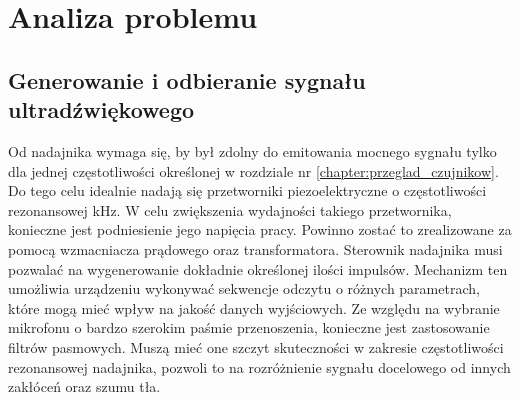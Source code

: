 \chapter[Analiza problemu]{Analiza problemu}

\label{chapter:analiza_problemu}


\def\w{1} %
\def\h{1} %

\newcommand{\mysin}[2] %
{%
  \begin{scope}[shift={#1}]
    \draw[thick,#2] (0,0) sin (0.125*\w,0.5*\h) cos (0.25*\w,0) sin (0.375*\w,-0.5*\h) cos (0.5*\w,0)
                          sin (0.625*\w,0.5*\h) cos (0.75*\w,0) sin (0.875*\w,-0.5*\h) cos (\w,0);
  \end{scope}
}

\section{Generowanie i odbieranie sygnału ultradźwiękowego}

Od nadajnika wymaga się, by był zdolny do emitowania mocnego sygnału tylko dla jednej częstotliwości określonej w rozdziale nr \ref{chapter:przeglad_czujnikow}.
Do tego celu idealnie nadają się przetworniki piezoelektryczne o częstotliwości rezonansowej \unit[40]{kHz}. W celu zwiększenia wydajności takiego przetwornika,
konieczne jest podniesienie jego napięcia pracy. Powinno zostać to zrealizowane za pomocą wzmacniacza prądowego oraz transformatora. 
Sterownik nadajnika musi pozwalać na wygenerowanie dokładnie określonej ilości impulsów. 
Mechanizm ten umożliwia urządzeniu wykonywać sekwencje odczytu o różnych parametrach, które mogą mieć wpływ na jakość danych wyjściowych. 
Ze względu na wybranie mikrofonu o bardzo szerokim paśmie przenoszenia, konieczne jest zastosowanie filtrów pasmowych. 
Muszą mieć one szczyt skuteczności w zakresie częstotliwości rezonansowej nadajnika, pozwoli to na rozróżnienie sygnału docelowego od innych zakłóceń oraz szumu tła.



